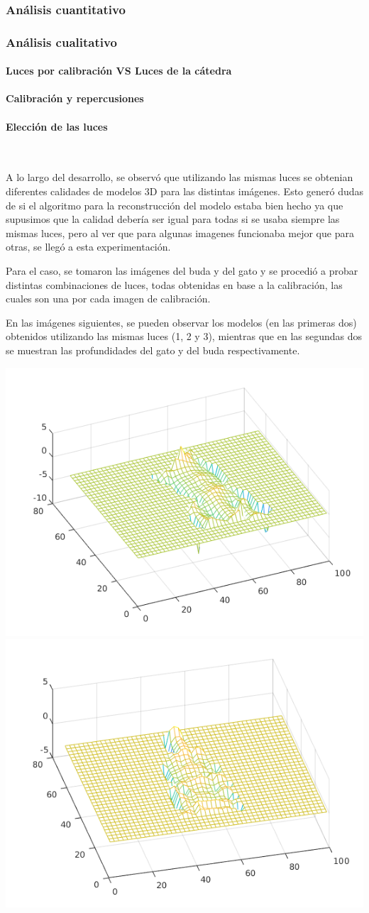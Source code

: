 \subsubsection{Análisis cuantitativo}



\subsubsection{Análisis cualitativo}

\paragraph{Luces por calibración VS Luces de la cátedra}

\paragraph{Calibración y repercusiones}

\paragraph{Elección de las luces}
\

A lo largo del desarrollo, se observó que utilizando las mismas luces se obtenian diferentes calidades de modelos 3D para las distintas imágenes. Esto generó dudas de si el algoritmo para la reconstrucción del modelo estaba bien hecho ya que supusimos que la calidad debería ser igual para todas si se usaba siempre las mismas luces, pero al ver que para algunas imagenes funcionaba mejor que para otras, se llegó a esta experimentación.

Para el caso, se tomaron las imágenes del buda y del gato y se procedió a probar distintas combinaciones de luces, todas obtenidas en base a la calibración, las cuales son una por cada imagen de calibración.

En las imágenes siguientes, se pueden observar los modelos (en las primeras dos) obtenidos utilizando las mismas luces (1, 2 y 3), mientras que en las segundas dos se muestran las profundidades del gato y del buda respectivamente.

\includegraphics[width=.4\linewidth]{imagenes/gato_small_model_123.png}
\includegraphics[width=.4\linewidth]{imagenes/buda_small_model_123.png}

